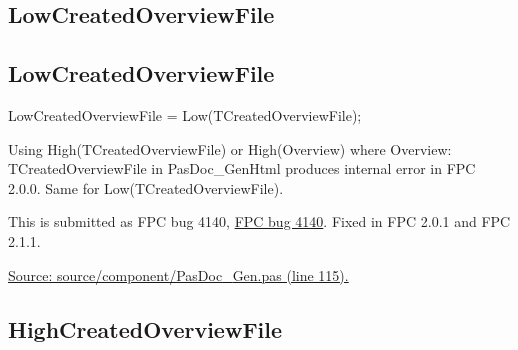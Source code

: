 \documentclass{report}
\newif\ifpdf
\begin{document}
\subsection*{\large{\textbf{LowCreatedOverviewFile}}\normalsize\hspace{1ex}\hrulefill}
\else
\subsection*{LowCreatedOverviewFile}
\fi
\label{PasDoc_Gen-LowCreatedOverviewFile}
\begin{list}{}{
\setlength{\itemindent}{0cm}
\setlength{\listparindent}{0cm}
\setlength{\leftmargin}{\evensidemargin}
\addtolength{\leftmargin}{\tmplength}
\settowidth{\labelsep}{X}
\addtolength{\leftmargin}{\labelsep}
\setlength{\labelwidth}{\tmplength}
}
\item[\textbf{Declaration}\hfill]
\ifpdf
\begin{flushleft}
\fi
\begin{ttfamily}
LowCreatedOverviewFile = Low(TCreatedOverviewFile);\end{ttfamily}

\ifpdf
\end{flushleft}
\fi

\par
\item[\textbf{Description}]
Using High(TCreatedOverviewFile) or High(Overview) where Overview: TCreatedOverviewFile in PasDoc{\_}GenHtml produces internal error in FPC 2.0.0. Same for Low(TCreatedOverviewFile).

This is submitted as FPC bug 4140, \href{http://www.freepascal.org/bugs/showrec.php3?ID=4140}{FPC bug 4140}. Fixed in FPC 2.0.1 and FPC 2.1.1.\par
\href{https://github.com/pasdoc/pasdoc/blob/master/source/component/PasDoc_Gen.pas#L115}{Source: source/component/PasDoc{\_}Gen.pas (line 115).}

\end{list}
\ifpdf
\subsection*{\large{\textbf{HighCreatedOverviewFile}}\normalsize\hspace{1ex}\hrulefill}
\else
\end{document}
